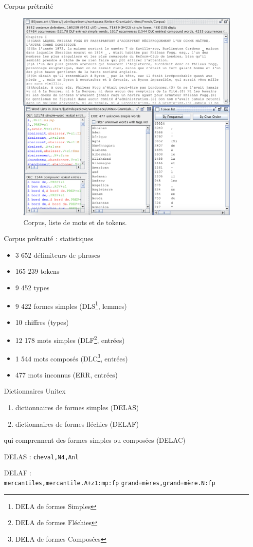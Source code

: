 \documentclass[xetex,xcolor={table,usenames,dvipsnames}]{beamer}
\begin{document}
\begin{frame}{Corpus prétraité}
			\begin{figure}[h] %
		\centering
		\includegraphics[width=0.65\linewidth]{img/corpus_pretraite.png}
		\caption{Corpus, liste de mots et de tokens.}
		\label{fig:ling_out_TAL}
	\end{figure}
\end{frame}

\begin{frame}{Corpus prétraité : statistiques}
	\begin{itemize}
		\item \textsc{3 652} délimiteurs de phrases
		\item \textsc{165 239} tokens
		\item \textsc{9 452} types
		\item \textsc{9 422} formes simples (\textsc{DLS}\footnote{\textsc{DELA} de formes Simples}, lemmes)
		\item \textsc{10} chiffres (types)
		\item \textsc{12 178} mots simples (\textsc{DLF}\footnote{\textsc{DELA} de formes Fléchies}, entrées)
		\item \textsc{1 544} mots composés (\textsc{DLC}\footnote{\textsc{DELA} de formes Composées}, entrées)
		\item \textsc{477} mots inconnus (\textsc{ERR}, entrées)
	\end{itemize}
\end{frame}

\begin{frame}{Dictionnaires Unitex}
	\begin{enumerate}
		\item dictionnaires de formes simples (\textsc{DELAS})
		\item dictionnaires de formes fléchies (\textsc{DELAF})
	\end{enumerate}
	qui comprennent des formes simples ou composées (\textsc{DELAC})
	\medskip
	
	\textsc{DELAS} :
	\texttt{cheval,N4,Anl}
	
	\textsc{DELAF} :\\
	\texttt{mercantiles,mercantile.A+z1:mp:fp}
	\texttt{grand=mères,grand=mère.N:fp}
\end{frame}
\end{document}
